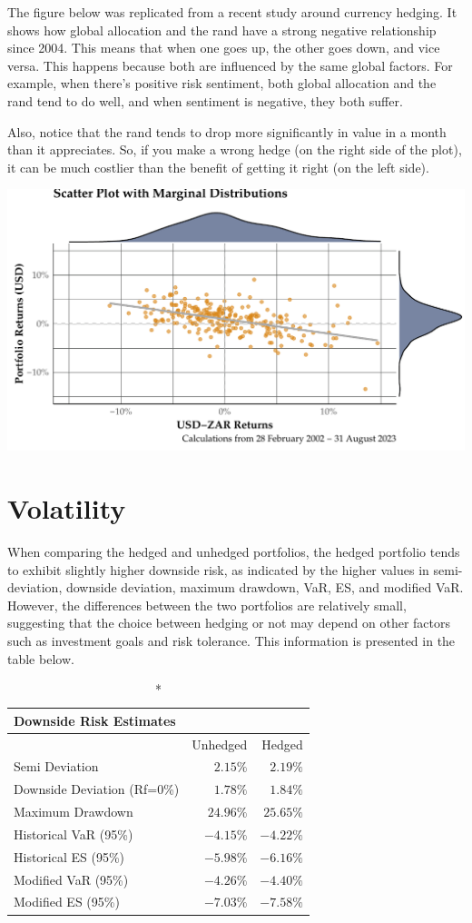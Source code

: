 \documentclass[11pt,preprint, authoryear]{elsarticle}
\numberwithin{equation}{section}
\numberwithin{figure}{section}
\numberwithin{table}{section}
\begin{document}
The figure below was replicated from a recent study around currency
hedging. It shows how global allocation and the rand have a strong
negative relationship since 2004. This means that when one goes up, the
other goes down, and vice versa. This happens because both are
influenced by the same global factors. For example, when there's
positive risk sentiment, both global allocation and the rand tend to do
well, and when sentiment is negative, they both suffer.

Also, notice that the rand tends to drop more significantly in value in
a month than it appreciates. So, if you make a wrong hedge (on the right
side of the plot), it can be much costlier than the benefit of getting
it right (on the left side).

\includegraphics{Question-2_files/figure-latex/scatterplot-1.pdf}

\hypertarget{volatility}{%
\section{Volatility}\label{volatility}}

When comparing the hedged and unhedged portfolios, the hedged portfolio
tends to exhibit slightly higher downside risk, as indicated by the
higher values in semi-deviation, downside deviation, maximum drawdown,
VaR, ES, and modified VaR. However, the differences between the two
portfolios are relatively small, suggesting that the choice between
hedging or not may depend on other factors such as investment goals and
risk tolerance. This information is presented in the table below.

\begin{longtable}{l|rr}
\caption*{
{\large Downside Risk Estimates}
} \\ 
\toprule
\multicolumn{1}{l}{} & Unhedged & Hedged \\ 
\midrule
Semi Deviation & $2.15\%$ & $2.19\%$ \\ 
Downside Deviation (Rf=0\%) & $1.78\%$ & $1.84\%$ \\ 
Maximum Drawdown & $24.96\%$ & $25.65\%$ \\ 
Historical VaR (95\%) & $-4.15\%$ & $-4.22\%$ \\ 
Historical ES (95\%) & $-5.98\%$ & $-6.16\%$ \\ 
Modified VaR (95\%) & $-4.26\%$ & $-4.40\%$ \\ 
Modified ES (95\%) & $-7.03\%$ & $-7.58\%$ \\ 
\bottomrule
\end{longtable}
\end{document}
